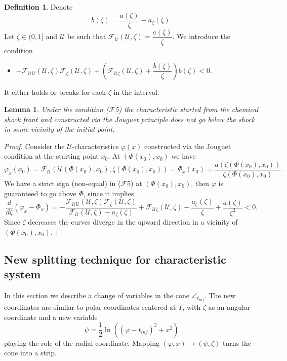 \documentclass[12pt]{article}
\newtheorem{lemma}{Lemma}
\theoremstyle{definition}
\newtheorem{definition}{Definition}
\begin{document}
\begin{definition}
Denote 
\[
b(\zeta) = \dfrac{a(\zeta)}{\zeta} - a_\zeta(\zeta).
\]
Let $\zeta\in(0, 1]$ and $\mathcal U$ be such that $\mathcal F_{\mathcal U} (\mathcal U, \zeta) = \dfrac{a(\zeta)}{\zeta}$. We introduce the condition
\begin{itemize}
    \item[($\mathcal F$5)] $-\mathcal F_{\mathcal U \mathcal U}(\mathcal U, \zeta)\mathcal F_{\zeta}(\mathcal U, \zeta) + \left(\mathcal F_{\mathcal U \zeta}(\mathcal U, \zeta) + \dfrac{b(\zeta)}{\zeta}\right) b(\zeta) < 0$.
\end{itemize}
It either holds or breaks for each $\zeta$ in the interval.
\end{definition}

\begin{lemma}\label{lem:Joguet_char_above_shock} 
Under the condition ($\mathcal{F}$5) the characteristic started from the chemical shock front and constructed via the Jouguet principle does not go below the shock in some vicinity of the initial point.
\end{lemma}
\begin{proof}
Consider the $\mathcal U$-characteristics $\varphi(x)$ constructed via the Jouguet condition at the starting point $x_0$. At $(\Phi(x_0), x_0)$ we have
\[
\varphi_x(x_0) = \mathcal F_{\mathcal U}(\mathcal U(\Phi(x_0),x_0), \zeta(\Phi(x_0),x_0)) = {\Phi}_x(x_0) = \dfrac{a(\zeta(\Phi(x_0), x_0))}{\zeta(\Phi(x_0), x_0)}.\]
We have a strict sign (non-equal) in ($\mathcal F$5) at $(\Phi(x_0), x_0)$, then $\varphi$ is guaranteed to go above $\Phi$, since it implies
\[
\dfrac{d}{d\zeta}(\varphi_x - \Phi_x) = -\dfrac{\mathcal F_{\mathcal U \mathcal U}(\mathcal U, \zeta)\mathcal F_{\zeta}(\mathcal U, \zeta)}{\mathcal F_{\mathcal U}(\mathcal U, \zeta) - a_\zeta(\zeta)} + \mathcal F_{\mathcal U \zeta}(\mathcal U, \zeta) - \dfrac{a_\zeta(\zeta)}{\zeta} + \dfrac{a(\zeta)}{\zeta^2} < 0.
\]
Since $\zeta$ decreases the curves diverge in the upward direction in a vicinity of $(\Phi(x_0), x_0)$.
\end{proof}


\subsection{New splitting technique for characteristic system}
In this section we describe a change of variables in the cone $\angle_{t_{inj}}$. The new coordinates are similar to polar coordinates centered at $T$, with $\zeta$ as an angular coordinate and a new variable
\begin{equation}
\label{eq:psi_def}
\psi = \frac12\ln((\varphi-t_{inj})^2 + x^2)
\end{equation}
playing the role of the radial coordinate.
Mapping $(\varphi,x)\to(\psi,\zeta)$ turns the cone into a strip.
\end{document}
